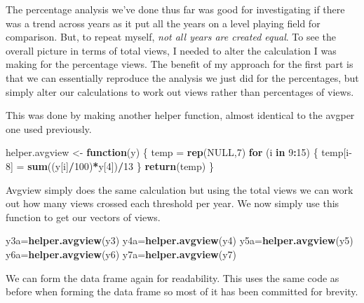 \documentclass[
]{article}
\newenvironment{Shaded}{\begin{snugshade}}{\end{snugshade}}
\newcommand{\ControlFlowTok}[1]{\textcolor[rgb]{0.13,0.29,0.53}{\textbf{#1}}}
\newcommand{\DecValTok}[1]{\textcolor[rgb]{0.00,0.00,0.81}{#1}}
\newcommand{\KeywordTok}[1]{\textcolor[rgb]{0.13,0.29,0.53}{\textbf{#1}}}
\newcommand{\NormalTok}[1]{#1}
\newcommand{\OperatorTok}[1]{\textcolor[rgb]{0.81,0.36,0.00}{\textbf{#1}}}
\newcommand{\OtherTok}[1]{\textcolor[rgb]{0.56,0.35,0.01}{#1}}
\newcommand{\StringTok}[1]{\textcolor[rgb]{0.31,0.60,0.02}{#1}}
\begin{document}
The percentage analysis we've done thus far was good for investigating
if there was a trend across years as it put all the years on a level
playing field for comparison. But, to repeat myself, \emph{not all years
are created equal}. To see the overall picture in terms of total views,
I needed to alter the calculation I was making for the percentage views.
The benefit of my approach for the first part is that we can essentially
reproduce the analysis we just did for the percentages, but simply alter
our calculations to work out views rather than percentages of views.

This was done by making another helper function, almost identical to the
avgper one used previously.

\begin{Shaded}
\begin{Highlighting}[]
\NormalTok{helper.avgview <-}\StringTok{ }\ControlFlowTok{function}\NormalTok{(y)}
\NormalTok{\{}
\NormalTok{  temp =}\StringTok{ }\KeywordTok{rep}\NormalTok{(}\OtherTok{NULL}\NormalTok{,}\DecValTok{7}\NormalTok{)}
  \ControlFlowTok{for}\NormalTok{ (i }\ControlFlowTok{in} \DecValTok{9}\OperatorTok{:}\DecValTok{15}\NormalTok{)}
\NormalTok{  \{}
\NormalTok{    temp[i}\DecValTok{-8}\NormalTok{] =}\StringTok{ }\KeywordTok{sum}\NormalTok{((y[i]}\OperatorTok{/}\DecValTok{100}\NormalTok{)}\OperatorTok{*}\NormalTok{y[}\DecValTok{4}\NormalTok{])}\OperatorTok{/}\DecValTok{13}
\NormalTok{  \}}
  \KeywordTok{return}\NormalTok{(temp)}
\NormalTok{\}}
\end{Highlighting}
\end{Shaded}

Avgview simply does the same calculation but using the total views we
can work out how many views crossed each threshold per year. We now
simply use this function to get our vectors of views.

\begin{Shaded}
\begin{Highlighting}[]
\NormalTok{y3a=}\KeywordTok{helper.avgview}\NormalTok{(y3)}
\NormalTok{y4a=}\KeywordTok{helper.avgview}\NormalTok{(y4)}
\NormalTok{y5a=}\KeywordTok{helper.avgview}\NormalTok{(y5)}
\NormalTok{y6a=}\KeywordTok{helper.avgview}\NormalTok{(y6)}
\NormalTok{y7a=}\KeywordTok{helper.avgview}\NormalTok{(y7)}
\end{Highlighting}
\end{Shaded}

We can form the data frame again for readability. This uses the same
code as before when forming the data frame so most of it has been
committed for brevity.
\end{document}

